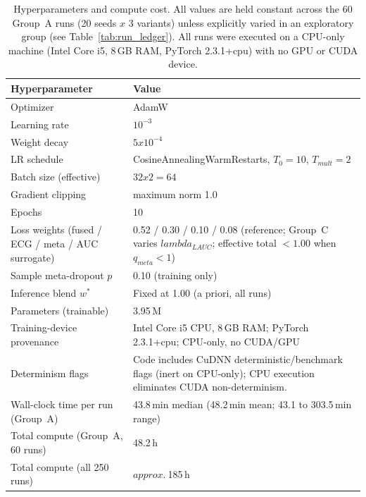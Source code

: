 \documentclass[mathematics,article,submit,pdftex]{Definitions/mdpi}
\def\mathrm#1{#1}%
\def\textbf#1{#1}%
\def\times{x}%
\def\approx{approx.\ }%
\def\lambda{lambda }%
\begin{document}
\begin{table}[H]
\caption{Hyperparameters and compute cost. All values are held constant across the 60 Group~A runs (20 seeds $\times$ 3 variants) unless explicitly varied in an exploratory group (see Table~\ref{tab:run_ledger}). All runs were executed on a CPU-only machine (Intel Core i5, 8\,GB RAM, PyTorch 2.3.1+cpu) with no GPU or CUDA device.}
\label{tab:hparams}
\centering
\small
\begin{tabularx}{\textwidth}{@{}>{\raggedright\arraybackslash}p{}X@{}}
\toprule
\textbf{Hyperparameter} & \textbf{Value} \\
\midrule
Optimizer              & AdamW \\
Learning rate          & $10^{-3}$ \\
Weight decay           & $5\times 10^{-4}$ \\
LR schedule            & CosineAnnealingWarmRestarts, $T_0{=}10$, $T_{\mathrm{mult}}{=}2$ \\
Batch size (effective) & $32\times 2 = 64$ \\
Gradient clipping      & maximum norm 1.0 \\
Epochs                 & 10 \\
Loss weights (fused / ECG / meta / AUC surrogate) & 0.52 / 0.30 / 0.10 / 0.08 (reference; Group~C varies $\lambda_{\mathrm{LAUC}}$; effective total ${<}1.00$ when $q_{\mathrm{meta}}{<}1$) \\
Sample meta-dropout $p$ & 0.10 (training only) \\
Inference blend $w^{\ast}$ & Fixed at 1.00 (a priori, all runs) \\
Parameters (trainable) & 3.95\,M \\
Training-device provenance & Intel Core i5 CPU, 8\,GB RAM; PyTorch 2.3.1+cpu; CPU-only, no CUDA/GPU \\
Determinism flags & Code includes CuDNN deterministic/benchmark flags (inert on CPU-only); CPU execution eliminates CUDA non-determinism. \\
Wall-clock time per run (Group~A) & 43.8\,min median (48.2\,min mean; 43.1 to 303.5\,min range) \\
Total compute (Group~A, 60 runs) & 48.2\,h \\
Total compute (all 250 runs) & $\approx$185\,h \\
\bottomrule
\end{tabularx}
\end{table}
\end{document}
